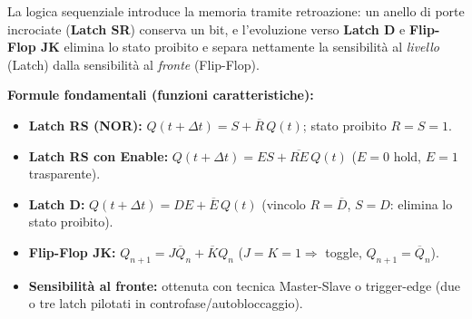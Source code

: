 \begin{important}
La logica sequenziale introduce la memoria tramite retroazione: un anello di porte incrociate (\textbf{Latch SR}) conserva un bit, e l'evoluzione verso \textbf{Latch D} e \textbf{Flip-Flop JK} elimina lo stato proibito e separa nettamente la sensibilità al \emph{livello} (Latch) dalla sensibilità al \emph{fronte} (Flip-Flop).
\end{important}

\begin{note}
\textbf{Formule fondamentali (funzioni caratteristiche):}
\begin{itemize}
    \item \textbf{Latch RS (NOR):} $Q(t+\Delta t) = S + \overline{R}\,Q(t)$; stato proibito $R=S=1$.
    \item \textbf{Latch RS con Enable:} $Q(t+\Delta t) = ES + \overline{RE}\,Q(t)$ ($E=0$ hold, $E=1$ trasparente).
    \item \textbf{Latch D:} $Q(t+\Delta t) = DE + \overline{E}\,Q(t)$ (vincolo $R=\overline{D}$, $S=D$: elimina lo stato proibito).
    \item \textbf{Flip-Flop JK:} $Q_{n+1} = J\overline{Q}_n + \overline{K}Q_n$ ($J=K=1 \Rightarrow$ toggle, $Q_{n+1}=\overline{Q}_n$).
    \item \textbf{Sensibilità al fronte:} ottenuta con tecnica Master-Slave o trigger-edge (due o tre latch pilotati in controfase/autobloccaggio).
\end{itemize}
\end{note}

